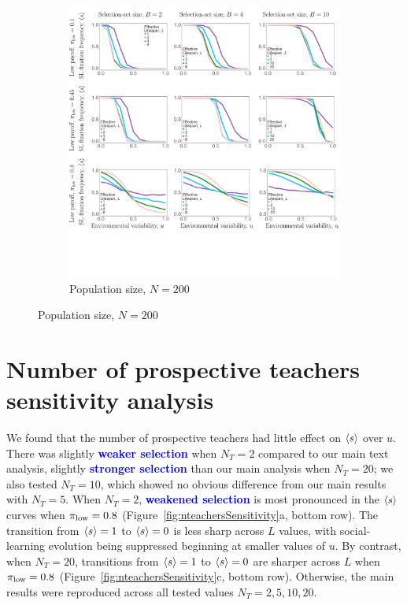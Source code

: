 \documentclass[letterpaper,11.5pt]{scrartcl}
\newcommand{\edit}[1]{{\bfseries \textcolor{blue} {#1}}}
\begin{document}
\begin{figure}
  \ContinuedFloat
	\begin{subfigure}{\textwidth}
	  \caption{Population size, $N=200$}
	  \includegraphics[width=\textwidth]{Figures/supplement/numagents=200/mainResultsPlots.pdf}
	\end{subfigure}
\end{figure}


\clearpage

\section{Number of prospective teachers sensitivity analysis}

We found that the number of prospective teachers had little effect on $\langle s \rangle$
over $u$. There was slightly \edit{weaker selection} when $N_T = 2$ compared to our 
main text analysis, slightly \edit{stronger selection} than our main analysis when $N_T = 20$; 
we also tested $N_T=10$, which showed no obvious difference from our main results
with $N_T = 5$. When $N_T = 2$, \edit{weakened selection} is most pronounced in the
$\langle s \rangle$ curves when $\pi_{\mathrm{low}}=0.8$ (Figure~\ref{fig:nteachersSensitivity}a, 
bottom row). The transition from $\langle s \rangle = 1$ to $\langle s \rangle = 0$ is less sharp
across $L$ values, with social-learning evolution being suppressed beginning
at smaller values of $u$. By contrast, when $N_T = 20$, transitions from 
$\langle s \rangle = 1$ to $\langle s \rangle = 0$ are sharper across $L$ when $\pi_{\mathrm{low}} = 0.8$
(Figure~\ref{fig:nteachersSensitivity}c, bottom row). Otherwise, the main 
results were reproduced across all tested values $N_T=2,5,10,20$.
\end{document}
